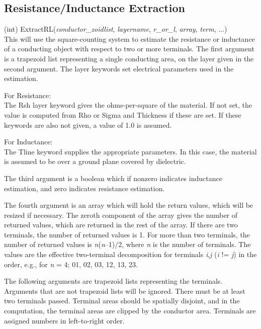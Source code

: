\subsection{Resistance/Inductance Extraction}

\begin{description}
\item{(int) \vt ExtractRL({\it conductor\_zoidlist\/}, {\it layername\/},
 {\it r\_or\_l\/}, {\it array\/}, {\it term\/}, ...)}\\
This will use the square-counting system to estimate the resistance or
inductance of a conducting object with respect to two or more
terminals.  The first argument is a trapezoid list representing a
single conducting area, on the layer given in the second argument. 
The layer keywords set electrical parameters used in the estimation.

\begin{description}
\item{For Resistance:}\\
  The {\et Rsh} layer keyword gives the ohms-per-square of the
  material.  If not set, the value is computed from {\et Rho} or {\et
  Sigma} and {\et Thickness} if these are set.  If these keywords are
  also not given, a value of 1.0 is assumed.

\item{For Inductance:}\\
  The {\vt Tline} keyword supplies the appropriate parameters.  In
  this case, the material is assumed to be over a ground plane covered
  by dielectric.
\end{description}

The third argument is a boolean which if nonzero indicates inductance
estimation, and zero indicates resistance estimation.

The fourth argument is an array which will hold the return values,
which will be resized if necessary.  The zeroth component of the array
gives the number of returned values, which are returned in the rest of
the array.  If there are two terminals, the number of returned values
is 1.  For more than two terminals, the number of returned values is
{\it n\/}{\vt *}({\it n\/}--1)/2, where {\it n} is the number of
terminals.  The values are the effective two-terminal decomposition
for terminals {\it i\/},{\it j} ({\it i} {\vt !=} {\it j\/}) in the
order, e.g., for {\it n} = 4; 01, 02, 03, 12, 13, 23.

The following arguments are trapezoid lists representing the
terminals.  Arguments that are not trapezoid lists will be ignored. 
There must be at least two terminals passed.  Terminal areas should be
spatially disjoint, and in the computation, the terminal areas are
clipped by the conductor area.  Terminals are assigned numbers in
left-to-right order.


\end{description}

